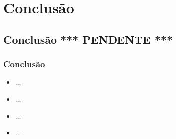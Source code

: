 \section{Conclusão} %

\subsection*{Conclusão *** PENDENTE ***} %


\begin{frame}
	\frametitle{Conclusão}
	\begin{itemize}
		\item<1-> ...
		\item<2-> ...
		\item<3-> ...
		\item<4-> ...
	\end{itemize}
\end{frame}
